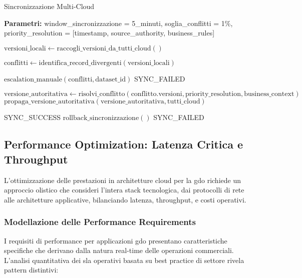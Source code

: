 \begin{algorithm}[H]
\caption{Sincronizzazione Multi-Cloud}
\label{alg:sincronizzazione-multi-cloud}
\begin{algorithmic}[1]
\State \textbf{Parametri:} window\_sincronizzazione = 5\_minuti, soglia\_conflitti = 1\%, priority\_resolution = [timestamp, source\_authority, business\_rules]

    \State $\text{versioni\_locali} \leftarrow \text{raccogli\_versioni\_da\_tutti\_cloud}()$
    
    \State $\text{conflitti} \leftarrow \text{identifica\_record\_divergenti}(\text{versioni\_locali})$
    
        \State $\text{escalation\_manuale}(\text{conflitti}, \text{dataset\_id})$
        \State \Return SYNC\_FAILED
    \EndIf
    
        \State $\text{versione\_autoritativa} \leftarrow \text{risolvi\_conflitto}(\text{conflitto.versioni}, \text{priority\_resolution}, \text{business\_context})$
        \State $\text{propaga\_versione\_autoritativa}(\text{versione\_autoritativa}, \text{tutti\_cloud})$
    \EndFor
    
        \State \Return SYNC\_SUCCESS
    \Else
        \State $\text{rollback\_sincronizzazione}()$
        \State \Return SYNC\_FAILED
    \EndIf
\EndFunction
\end{algorithmic}
\end{algorithm}

\subsection{Performance Optimization: Latenza Critica e Throughput}
\label{subsec:performance-optimization}

L'ottimizzazione delle prestazioni in architetture cloud per la \gls{gdo} richiede un approccio olistico che consideri l'intera stack tecnologica, dai protocolli di rete alle architetture applicative, bilanciando latenza, throughput, e costi operativi.

\subsubsection{Modellazione delle Performance Requirements}

I requisiti di performance per applicazioni \gls{gdo} presentano caratteristiche specifiche che derivano dalla natura real-time delle operazioni commerciali. L'analisi quantitativa dei \gls{sla} operativi basata su best practice di settore rivela pattern distintivi:

